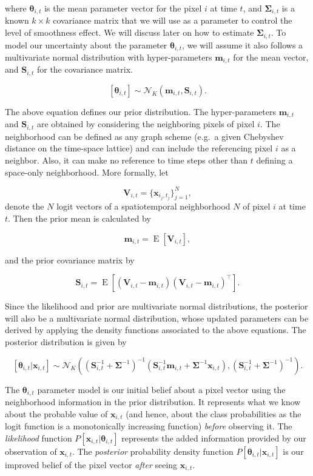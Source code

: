 \documentclass[
  11pt,
]{report}
\begin{document}
where \(\boldsymbol\theta_{i,t}\) is the mean parameter vector for the
pixel \(i\) at time \(t\), and \(\boldsymbol\Sigma_{i,t}\) is a known
\(k\times{}k\) covariance matrix that we will use as a parameter to
control the level of smoothness effect. We will discuss later on how to
estimate \(\boldsymbol\Sigma_{i,t}\). To model our uncertainty about the
parameter \(\boldsymbol\theta_{i,t}\), we will assume it also follows a
multivariate normal distribution with hyper-parameters
\(\mathbf{m}_{i,t}\) for the mean vector, and \(\mathbf{S}_{i,t}\) for
the covariance matrix.

\[
    [\boldsymbol\theta_{i,t}]\sim\mathcal{N}_{K}(\mathbf{m}_{i,t}, \mathbf{S}_{i,t}).
\]

The above equation defines our prior distribution. The hyper-parameters
\(\mathbf{m}_{i,t}\) and \(\mathbf{S}_{i,t}\) are obtained by
considering the neighboring pixels of pixel \(i\). The neighborhood can
be defined as any graph scheme (e.g.~a given Chebyshev distance on the
time-space lattice) and can include the referencing pixel \(i\) as a
neighbor. Also, it can make no reference to time steps other than \(t\)
defining a space-only neighborhood. More formally, let

\[
    \mathbf{V}_{i,t}=\{\mathbf{x}_{i_{j},t_{j}}\}_{j=1}^{N}, 
\] denote the \(N\) logit vectors of a spatiotemporal neighborhood \(N\)
of pixel \(i\) at time \(t\). Then the prior mean is calculated by

\[
    \mathbf{m}_{i,t}=\operatorname{E}[\mathbf{V}_{i,t}],
\]

and the prior covariance matrix by

\[
    \mathbf{S}_{i,t}=\operatorname{E}\left[
      \left(\mathbf{V}_{i,t}-\mathbf{m}_{i,t}\right)
      \left(\mathbf{V}_{i,t}-\mathbf{m}_{i,t}\right)^\intercal
    \right].
\]

Since the likelihood and prior are multivariate normal distributions,
the posterior will also be a multivariate normal distribution, whose
updated parameters can be derived by applying the density functions
associated to the above equations. The posterior distribution is given
by

\[
    [\boldsymbol\theta_{i,t}|\mathbf{x}_{i,t}]\sim\mathcal{N}_{K}\left(
    (\mathbf{S}_{i,t}^{-1} + \boldsymbol\Sigma^{-1})^{-1}( \mathbf{S}_{i,t}^{-1}\mathbf{m}_{i,t} + \boldsymbol\Sigma^{-1} \mathbf{x}_{i,t}),
    (\mathbf{S}_{i,t}^{-1} + \boldsymbol\Sigma^{-1})^{-1}
    \right).
\]

The \(\boldsymbol\theta_{i,t}\) parameter model is our initial belief
about a pixel vector using the neighborhood information in the prior
distribution. It represents what we know about the probable value of
\(\mathbf{x}_{i,t}\) (and hence, about the class probabilities as the
logit function is a monotonically increasing function) \emph{before}
observing it. The \emph{likelihood} function
\(P[\mathbf{x}_{i,t}|\boldsymbol\theta_{i,t}]\) represents the added
information provided by our observation of \(\mathbf{x}_{i,t}\). The
\emph{posterior} probability density function
\(P[\boldsymbol\theta_{i,t}|\mathbf{x}_{i,t}]\) is our improved belief
of the pixel vector \emph{after} seeing \(\mathbf{x}_{i,t}\).
\end{document}
